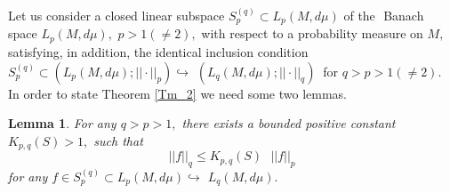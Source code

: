 \documentclass[pdflatex,sn-mathphys-num]{sn-jnl}%
\theoremstyle{thmstyleone}%
\newtheorem{lemma}[theorem]{Lemma}%
\theoremstyle{thmstyletwo}%
\theoremstyle{thmstylethree}%
\begin{document}
Let us consider a closed linear subspace $S_{p}^{(q)}\subset L_{p}(M,d\mu )$
of the $\mathbb{ }$ Banach space $L_{p}(M,d\mu ),$ $p>1(\neq 2),$ with
respect to a probability measure on $M,$ satisfying, in addition, the
identical inclusion condition $S_{p}^{(q)}\subset \left( L_{p}(M,d\mu
);||\cdot ||_{p}\right) \hookrightarrow $ $\left( L_{q}(M,d\mu );||\cdot
||_{q}\right) \ $ for $q>p>1(\neq 2).$ In order to state Theorem \ref{Tm_2}
 we need some two lemmas.

\begin{lemma}
	\label{Lm_1} For any $q>p>1,$ there exists a bounded positive constant $%
	K_{p,q}(S)>1,$ such that 
	\begin{equation}
		||f||_{q}\leq K_{p,q}(S)\text{ }||f||_{p}  \label{S0}
	\end{equation}%
	for any $f\in S_{p}^{(q)}\subset L_{p}(M,d\mu )\hookrightarrow $ $%
	L_{q}(M,d\mu ).$
\end{lemma}
\end{document}
